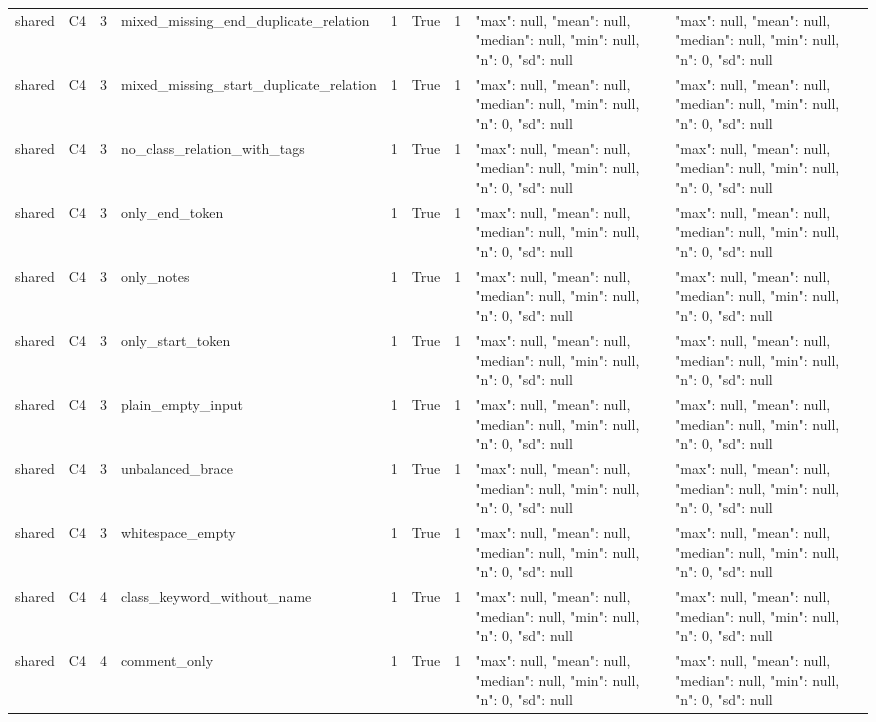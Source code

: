 \begin{tabular}{lllllllll}
shared & C4 & 3 & mixed\_missing\_end\_duplicate\_relation & 1 & True & 1 & {"max": null, "mean": null, "median": null, "min": null, "n": 0, "sd": null} & {"max": null, "mean": null, "median": null, "min": null, "n": 0, "sd": null} \\
shared & C4 & 3 & mixed\_missing\_start\_duplicate\_relation & 1 & True & 1 & {"max": null, "mean": null, "median": null, "min": null, "n": 0, "sd": null} & {"max": null, "mean": null, "median": null, "min": null, "n": 0, "sd": null} \\
shared & C4 & 3 & no\_class\_relation\_with\_tags & 1 & True & 1 & {"max": null, "mean": null, "median": null, "min": null, "n": 0, "sd": null} & {"max": null, "mean": null, "median": null, "min": null, "n": 0, "sd": null} \\
shared & C4 & 3 & only\_end\_token & 1 & True & 1 & {"max": null, "mean": null, "median": null, "min": null, "n": 0, "sd": null} & {"max": null, "mean": null, "median": null, "min": null, "n": 0, "sd": null} \\
shared & C4 & 3 & only\_notes & 1 & True & 1 & {"max": null, "mean": null, "median": null, "min": null, "n": 0, "sd": null} & {"max": null, "mean": null, "median": null, "min": null, "n": 0, "sd": null} \\
shared & C4 & 3 & only\_start\_token & 1 & True & 1 & {"max": null, "mean": null, "median": null, "min": null, "n": 0, "sd": null} & {"max": null, "mean": null, "median": null, "min": null, "n": 0, "sd": null} \\
shared & C4 & 3 & plain\_empty\_input & 1 & True & 1 & {"max": null, "mean": null, "median": null, "min": null, "n": 0, "sd": null} & {"max": null, "mean": null, "median": null, "min": null, "n": 0, "sd": null} \\
shared & C4 & 3 & unbalanced\_brace & 1 & True & 1 & {"max": null, "mean": null, "median": null, "min": null, "n": 0, "sd": null} & {"max": null, "mean": null, "median": null, "min": null, "n": 0, "sd": null} \\
shared & C4 & 3 & whitespace\_empty & 1 & True & 1 & {"max": null, "mean": null, "median": null, "min": null, "n": 0, "sd": null} & {"max": null, "mean": null, "median": null, "min": null, "n": 0, "sd": null} \\
shared & C4 & 4 & class\_keyword\_without\_name & 1 & True & 1 & {"max": null, "mean": null, "median": null, "min": null, "n": 0, "sd": null} & {"max": null, "mean": null, "median": null, "min": null, "n": 0, "sd": null} \\
shared & C4 & 4 & comment\_only & 1 & True & 1 & {"max": null, "mean": null, "median": null, "min": null, "n": 0, "sd": null} & {"max": null, "mean": null, "median": null, "min": null, "n": 0, "sd": null} \\

\end{tabular}
